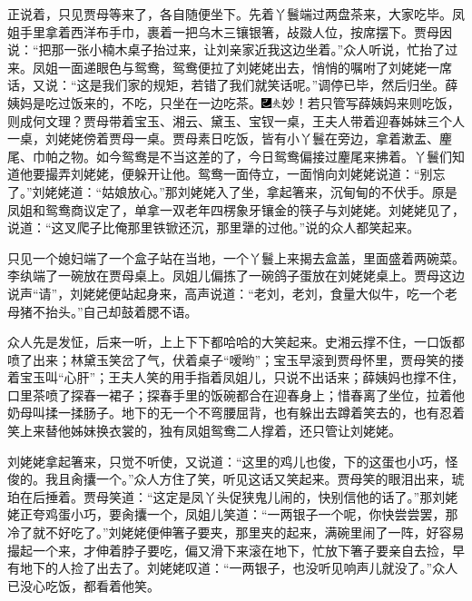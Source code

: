正说着，只见贾母等来了，各自随便坐下。先着丫鬟端过两盘茶来，大家吃毕。凤姐手里拿着西洋布手巾，裹着一把乌木三镶银箸，敁敠人位，按席摆下。贾母因说：``把那一张小楠木桌子抬过来，让刘亲家近我这边坐着。''众人听说，忙抬了过来。凤姐一面递眼色与鸳鸯，鸳鸯便拉了刘姥姥出去，悄悄的嘱咐了刘姥姥一席话，又说：``这是我们家的规矩，若错了我们就笑话呢。''调停已毕，然后归坐。薛姨妈是吃过饭来的，不吃，只坐在一边吃茶。{\includegraphics[width=3mm]{../Images/00003}\includegraphics[width=3mm]{../Images/00012}\footnotesize \kaishu 妙！若只管写薛姨妈来则吃饭，则成何文理？}贾母带着宝玉、湘云、黛玉、宝钗一桌，王夫人带着迎春姊妹三个人一桌，刘姥姥傍着贾母一桌。贾母素日吃饭，皆有小丫鬟在旁边，拿着漱盂、麈尾、巾帕之物。如今鸳鸯是不当这差的了，今日鸳鸯偏接过麈尾来拂着。丫鬟们知道他要撮弄刘姥姥，便躲开让他。鸳鸯一面侍立，一面悄向刘姥姥说道：``别忘了。''刘姥姥道：``姑娘放心。''那刘姥姥入了坐，拿起箸来，沉甸甸的不伏手。原是凤姐和鸳鸯商议定了，单拿一双老年四楞象牙镶金的筷子与刘姥姥。刘姥姥见了，说道：``这叉爬子比俺那里铁锨还沉，那里犟的过他。''说的众人都笑起来。

只见一个媳妇端了一个盒子站在当地，一个丫鬟上来揭去盒盖，里面盛着两碗菜。李纨端了一碗放在贾母桌上。凤姐儿偏拣了一碗鸽子蛋放在刘姥姥桌上。贾母这边说声``请''，刘姥姥便站起身来，高声说道：``老刘，老刘，食量大似牛，吃一个老母猪不抬头。''自己却鼓着腮不语。

众人先是发怔，后来一听，上上下下都哈哈的大笑起来。史湘云撑不住，一口饭都喷了出来；林黛玉笑岔了气，伏着桌子``嗳哟''；宝玉早滚到贾母怀里，贾母笑的搂着宝玉叫``心肝''；王夫人笑的用手指着凤姐儿，只说不出话来；薛姨妈也撑不住，口里茶喷了探春一裙子；探春手里的饭碗都合在迎春身上；惜春离了坐位，拉着他奶母叫揉一揉肠子。地下的无一个不弯腰屈背，也有躲出去蹲着笑去的，也有忍着笑上来替他姊妹换衣裳的，独有凤姐鸳鸯二人撑着，还只管让刘姥姥。

刘姥姥拿起箸来，只觉不听使，又说道：``这里的鸡儿也俊，下的这蛋也小巧，怪俊的。我且肏攮一个。''众人方住了笑，听见这话又笑起来。贾母笑的眼泪出来，琥珀在后捶着。贾母笑道：``这定是凤丫头促狭鬼儿闹的，快别信他的话了。''那刘姥姥正夸鸡蛋小巧，要肏攮一个，凤姐儿笑道：``一两银子一个呢，你快尝尝罢，那冷了就不好吃了。''刘姥姥便伸箸子要夹，那里夹的起来，满碗里闹了一阵，好容易撮起一个来，才伸着脖子要吃，偏又滑下来滚在地下，忙放下箸子要亲自去捡，早有地下的人捡了出去了。刘姥姥叹道：``一两银子，也没听见响声儿就没了。''众人已没心吃饭，都看着他笑。


